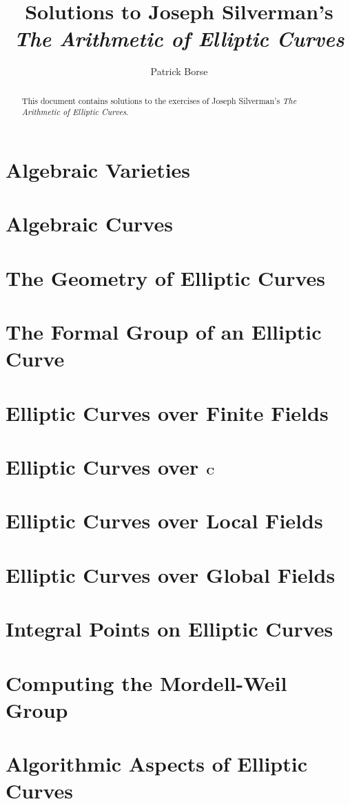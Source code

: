 \documentclass[oneside]{amsbook}
\title{Solutions to Joseph Silverman's\\ \emph{The Arithmetic of Elliptic Curves}}
\author{Patrick Borse}
\begin{document}
\begin{abstract}
This document contains solutions to the exercises of Joseph Silverman's \emph{The Arithmetic of Elliptic Curves}.
\end{abstract}

\maketitle

\tableofcontents

\chapter{Algebraic Varieties}


\chapter{Algebraic Curves}


\chapter{The Geometry of Elliptic Curves}


\chapter{The Formal Group of an Elliptic Curve}


\chapter{Elliptic Curves over Finite Fields}


\chapter{Elliptic Curves over $\mathbf{C}$}


\chapter{Elliptic Curves over Local Fields}


\chapter{Elliptic Curves over Global Fields}


\chapter{Integral Points on Elliptic Curves}


\chapter{Computing the Mordell-Weil Group}


\chapter{Algorithmic Aspects of Elliptic Curves}

\end{document}
